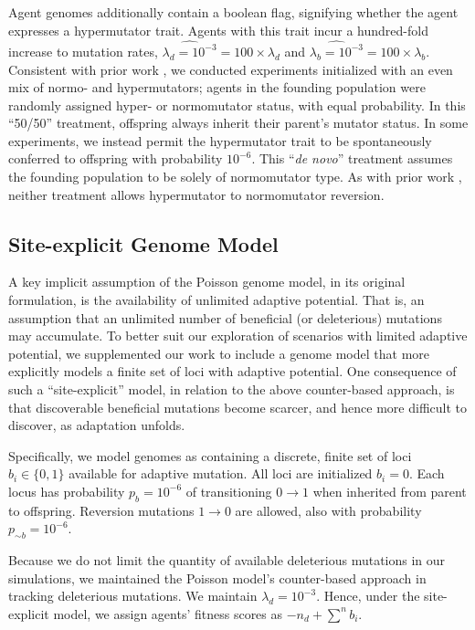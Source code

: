 Agent genomes additionally contain a boolean flag, signifying whether the agent expresses a hypermutator trait.
Agents with this trait incur a hundred-fold increase to mutation rates, $\hat{\lambda_d=10^{-3}} = 100 \times \lambda_d$ and $\hat{\lambda_b=10^{-3}} = 100 \times \lambda_b$.
Consistent with prior work \citep{raynes2018sign}, we conducted experiments initialized with an even mix of normo- and hypermutators;
agents in the founding population were randomly assigned hyper- or normomutator status, with equal probability.
In this ``50/50'' treatment, offspring always inherit their parent's mutator status.
In some experiments, we instead permit the hypermutator trait to be spontaneously conferred to offspring with probability $10^{-6}$.
This ``\textit{de novo}'' treatment assumes the founding population to be solely of normomutator type.
As with prior work \citep{raynes2018sign}, neither treatment allows hypermutator to normomutator reversion.

\subsection{Site-explicit Genome Model} \label{sec:site-explicit}

A key implicit assumption of the Poisson genome model, in its original formulation, is the availability of unlimited adaptive potential.
That is, an assumption that an unlimited number of beneficial (or deleterious) mutations may accumulate.
To better suit our exploration of scenarios with limited adaptive potential, we supplemented our work to include a genome model that more explicitly models a finite set of loci with adaptive potential.
One consequence of such a ``site-explicit'' model, in relation to the above counter-based approach, is that discoverable beneficial mutations become scarcer, and hence more difficult to discover, as adaptation unfolds.

Specifically, we model genomes as containing a discrete, finite set of loci $b_i \in \{0, 1\}$ available for adaptive mutation.
All loci are initialized $b_i = 0$.
Each locus has probability $p_b = 10^{-6}$ of transitioning $0 \rightarrow 1$ when inherited from parent to offspring.
Reversion mutations $1 \rightarrow 0$ are allowed, also with probability $p_{\sim b} = 10^{-6}$.

Because we do not limit the quantity of available deleterious mutations in our simulations, we maintained the Poisson model's counter-based approach in tracking deleterious mutations.
We maintain $\lambda_d = 10^{-3}$.
Hence, under the site-explicit model, we assign agents' fitness scores as $-n_d + \sum^n b_i$.

